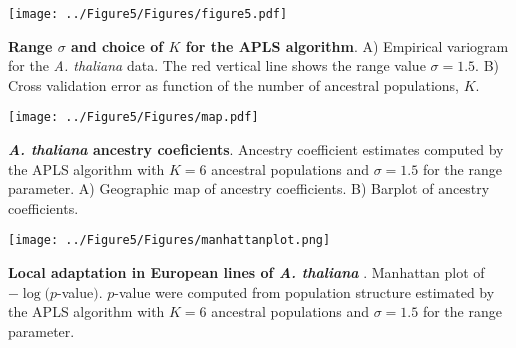 \clearpage 
\newpage

\begin{center}
\texttt{[image: ../Figure5/Figures/figure5.pdf]}
\end{center}
 {\bf Range $\sigma$ and choice of $K$ for the APLS algorithm}. A) Empirical variogram for the {\it A. thaliana} data. The red vertical line shows the range value $\sigma = 1.5$. B) Cross validation error as function of the number of ancestral populations, $K$.

\clearpage 
\newpage

\begin{center}
\texttt{[image: ../Figure5/Figures/map.pdf]}
\end{center}
 {\bf {\it A. thaliana} ancestry coeficients}. Ancestry coefficient estimates computed by the APLS algorithm with $K=6$ ancestral populations and $\sigma = 1.5$ for the range parameter. A) Geographic map of ancestry coefficients. B) Barplot of ancestry coefficients.

\clearpage 
\newpage

\begin{center}
\texttt{[image: ../Figure5/Figures/manhattanplot.png]}
\end{center}
 {\bf Local adaptation in European lines of \bf {\it A.  thaliana} }. Manhattan plot of $-\log(p$\rm -value$)$.  $p$-value were computed from population structure estimated by the APLS algorithm with $K=6$ ancestral populations and $\sigma = 1.5$ for the range parameter.



